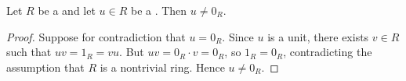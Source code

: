 \begin{lemma} \label{lemma:unit_is_nonzero_in_nonzero_ring}
Let $R$ be a  and let $u \in R$ be a . Then $u \neq 0_R$.
\end{lemma}

\begin{proof}
Suppose for contradiction that $u = 0_R$. Since $u$ is a unit, there exists $v \in R$ such that $u v = 1_R = v u$. But $u v = 0_R \cdot v = 0_R$, so $1_R = 0_R$, contradicting the assumption that $R$ is a nontrivial ring. Hence $u \neq 0_R$.
\end{proof}